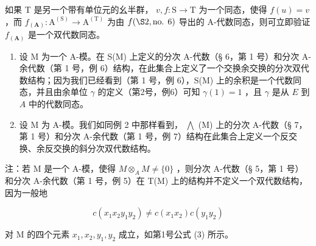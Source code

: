 如果 T 是另一个带有单位元的幺半群， \(v, f: \mathrm{S} \to \mathrm{T}\) 为一个同态，使得 \(f(u) = v\) ，而 \(f_{(\mathbf{A})}: \mathrm{A}^{(\mathrm{S})} \to \mathrm{A}^{(\mathrm{T})}\) 为由 \(f(\S 2, \text{no. } 6)\) 导出的 A-代数同态，则可立即验证 \(f_{(\mathbf{A})}\) 是一个双代数同态。

\begin{enumerate}
\def\labelenumi{(\arabic{enumi})}
\setcounter{enumi}{1}
\item
  设 M 为一个 A-模。在 S(M) 上定义的分次 A-代数（§ 6，第 1 号）和分次 A-余代数（第 1 号，例 6）结构，在此集合上定义了一个交换余交换的分次双代数结构；因为我们已经看到（第 1 号，例 6），S(M) 上的余积是一个代数同态，并且由余单位 \(\gamma\) 的定义（第2号，例6）可知 \(\gamma(1) = 1\) ，且 \(\gamma\) 是从 \(E\) 到 \(A\) 中的代数同态。
\item
  设 M 为 A-模。我们如同例 2 中那样看到， \(\bigwedge\) (M) 上的分次 A-代数（§ 7，第 1 号）和分次 A-余代数（第 1 号，例 7）结构在此集合上定义一个反交换、余反交换的斜分次双代数结构。
\end{enumerate}

注：若 M 是一个 A-模，使得 \(M \otimes_{A} M \neq \{0\}\) ，则分次 A-代数（§ 5，第 1 号）和分次 A-余代数（第 1 号，例 5）在 T(M) 上的结构并不定义一个双代数结构，因为一般地

\[
c (x _ {1} x _ {2} y _ {1} y _ {2}) \neq c (x _ {1} x _ {2}) c (y _ {1} y _ {2})
\]

对 M 的四个元素 \(x_{1}, x_{2}, y_{1}, y_{2}\) 成立，如第1号公式 (3) 所示。

